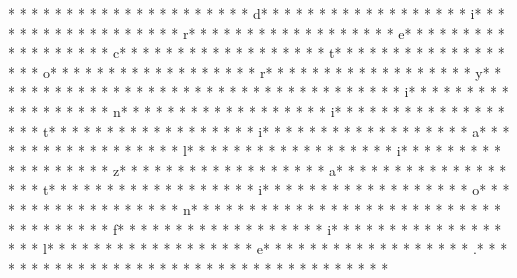 * *  *  * * *  * * *  * * *  *  * * *  *  * * *  * d* * *  * * *  * * *  *  * * *  *  * * *  * i* * *  * * *  * * *  *  * * *  *  * * *  * r* * *  * * *  * * *  *  * * *  *  * * *  * e* * *  * * *  * * *  *  * * *  *  * * *  * c* * *  * * *  * * *  *  * * *  *  * * *  * t* * *  * * *  * * *  *  * * *  *  * * *  * o* * *  * * *  * * *  *  * * *  *  * * *  * r* * *  * * *  * * *  *  * * *  *  * * *  * y* * *  * * *  * * *  *  * * *  *  * * *  *  * * *  * * *  * * *  *  * * *  *  * * *  * i* * *  * * *  * * *  *  * * *  *  * * *  * n* * *  * * *  * * *  *  * * *  *  * * *  * i* * *  * * *  * * *  *  * * *  *  * * *  * t* * *  * * *  * * *  *  * * *  *  * * *  * i* * *  * * *  * * *  *  * * *  *  * * *  * a* * *  * * *  * * *  *  * * *  *  * * *  * l* * *  * * *  * * *  *  * * *  *  * * *  * i* * *  * * *  * * *  *  * * *  *  * * *  * z* * *  * * *  * * *  *  * * *  *  * * *  * a* * *  * * *  * * *  *  * * *  *  * * *  * t* * *  * * *  * * *  *  * * *  *  * * *  * i* * *  * * *  * * *  *  * * *  *  * * *  * o* * *  * * *  * * *  *  * * *  *  * * *  * n* * *  * * *  * * *  *  * * *  *  * * *  *  * * *  * * *  * * *  *  * * *  *  * * *  * f* * *  * * *  * * *  *  * * *  *  * * *  * i* * *  * * *  * * *  *  * * *  *  * * *  * l* * *  * * *  * * *  *  * * *  *  * * *  * e* * *  * * *  * * *  *  * * *  *  * * *  * .* * *  * * *  * * *  *  * * *  *  * * *  *  * * *  * * *  * * *  *  * * *  *  * * *  * 
